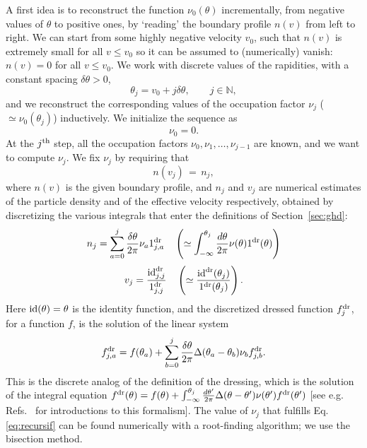 A first idea is to reconstruct the function $\nu_0(\theta)$ incrementally, from negative values of $\theta$ to positive ones, by `reading' the boundary profile $n(v)$ from left to right. We can start from some highly negative velocity $v_0$, such that $n(v)$ is extremely small for all $v \leq v_0$ so it can be assumed to (numerically) vanish: $n(v) = 0$ for all $v \leq v_0$. We work with discrete values of the rapidities, with a constant spacing $\delta \theta > 0$, 
\begin{equation}
    \theta_j  =  v_0 + j \delta \theta , \qquad j \in \mathbb{N} ,
\end{equation}
and we reconstruct the corresponding values of the occupation factor $\nu_j$ ($\simeq \nu_0(\theta_j)$) inductively. We initialize the sequence as
\begin{equation}
    \nu_0 = 0 .
\end{equation}
At the $j^{\rm th}$ step, all the occupation factors $\nu_0, \nu_1, \dots, \nu_{j-1}$ are known, and we want to compute $\nu_j$. We fix $\nu_{j}$ by requiring that
\begin{equation}
    n (v_{j} ) \, = \, n_j , %
    \label{eq:recursif}
\end{equation}
where $n(v)$ is the given boundary profile, and $n_j$ and $v_j$ are numerical estimates of the particle density and of the effective velocity respectively, obtained by discretizing the various integrals that enter the definitions of Section~\ref{sec:ghd}:
$$
n_j = \sum_{a=0}^j \frac{\delta \theta}{2\pi} \nu_a  1^{\rm dr}_{j,a} \quad  \left( \simeq \int^{\theta_j}_{-\infty} \frac{d\theta}{2\pi} \nu(\theta) 1^{\rm dr}(\theta) \right)
$$
$$
v_j = \frac{{\rm id}^{\rm dr}_{j,j}}{1^{\rm dr}_{j,j}}  \quad \left( \simeq \frac{{\rm id}^{\rm dr} (\theta_j)}{1^{\rm dr} (\theta_j)} \right) .
$$
Here ${\rm id}(\theta) = \theta$ is the identity function, and the discretized dressed function $f^{\rm dr}_j$, for a function $f$, is the solution of the linear system
$$
f^{\rm dr}_{j,a} = f (\theta_a) + \sum_{b=0}^j \frac{\delta \theta}{2\pi} \Delta(\theta_a - \theta_b) \nu_b  f^{\rm dr}_{j,b} .
$$
This is the discrete analog of the definition of the dressing, which is the solution of the integral equation $ f^{\rm dr}(\theta) = f(\theta) + \int_{-\infty}^{\theta_j} \frac{d\theta'}{2\pi} \Delta (\theta-\theta') \nu(\theta') f^{\rm dr}(\theta') $ [see e.g. Refs.~\cite{doyon2020lecture,bouchoule_generalized_2022} for introductions to this formalism]. The value of $\nu_j$ that fulfills Eq.\eqref{eq:recursif} can be found numerically with a root-finding algorithm; we use the bisection method.



